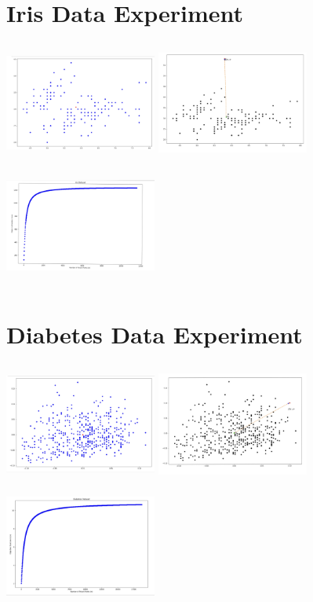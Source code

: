 \documentclass[a4paper,12pt]{article}
\begin{document}
\section{Iris Data Experiment}
\includegraphics [width=5cm, height=4cm]{iris_data}
\includegraphics [width=5cm, height=4cm]{iris_data_poisoned}
\includegraphics [width=5cm, height=4cm]{iris_poison_vs_score}

\section{Diabetes Data Experiment}
\includegraphics [width=5cm, height=4cm]{diabetes_data}
\includegraphics [width=5cm, height=4cm]{diabetes_data_poisoned}
\includegraphics [width=5cm, height=4cm]{diabetes_poison_vs_score}
\end{document}
